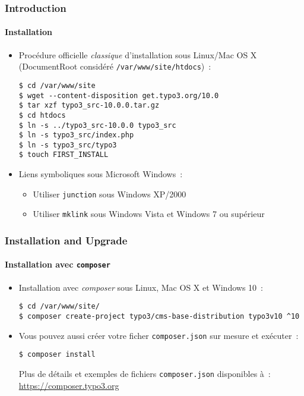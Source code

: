 
\begin{frame}[fragile]
	\frametitle{Introduction}
	\framesubtitle{Installation}

	\begin{itemize}
		\item Procédure officielle \textit{classique} d'installation sous Linux/Mac OS X\newline
			(DocumentRoot considéré \texttt{/var/www/site/htdocs})~:
		\begin{lstlisting}
$ cd /var/www/site
$ wget --content-disposition get.typo3.org/10.0
$ tar xzf typo3_src-10.0.0.tar.gz
$ cd htdocs
$ ln -s ../typo3_src-10.0.0 typo3_src
$ ln -s typo3_src/index.php
$ ln -s typo3_src/typo3
$ touch FIRST_INSTALL
		\end{lstlisting}

		\item Liens symboliques sous Microsoft Windows~:

			\begin{itemize}
				\item Utiliser \texttt{junction} sous Windows XP/2000
				\item Utiliser \texttt{mklink} sous Windows Vista et Windows 7 ou supérieur
			\end{itemize}

	\end{itemize}
\end{frame}


\begin{frame}[fragile]
	\frametitle{Installation and Upgrade}
	\framesubtitle{Installation avec \texttt{composer}}

	\begin{itemize}
		\item Installation avec \textit{composer} sous Linux, Mac OS X et Windows 10~:

			\begin{lstlisting}
$ cd /var/www/site/
$ composer create-project typo3/cms-base-distribution typo3v10 ^10
			\end{lstlisting}

		\item Vous pouvez aussi créer votre ficher \texttt{composer.json} sur mesure
			et exécuter~:

			\begin{lstlisting}
$ composer install
			\end{lstlisting}

			Plus de détails et exemples de fichiers \texttt{composer.json} disponibles à~:\newline
			\smaller
				\href{https://composer.typo3.org}{https://composer.typo3.org}
			\normalsize

	\end{itemize}
\end{frame}

